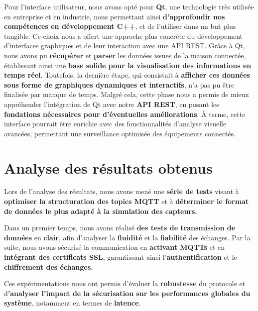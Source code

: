 \documentclass[10pt, a4paper]{report}
\begin{document}
	Pour l’interface utilisateur, nous avons opté pour \textbf{Qt}, une technologie très utilisée en entreprise et en industrie, nous permettant ainsi \textbf{d’approfondir nos compétences en développement C++}, et de l'utiliser dans un but plus tangible. Ce choix nous a offert une approche plus concrète du développement d’interfaces graphiques et de leur interaction avec une API REST.	
	Grâce à Qt, nous avons pu \textbf{récupérer} et \textbf{parser} les données issues de la maison connectée, établissant ainsi une \textbf{base solide pour la visualisation des informations en temps réel}. Toutefois, la dernière étape, qui consistait à \textbf{afficher ces données sous forme de graphiques dynamiques et interactifs}, n’a pas pu être finalisée par manque de temps.
	Malgré cela, cette phase nous a permis de mieux appréhender l’intégration de Qt avec notre \textbf{API REST}, en posant les \textbf{fondations nécessaires pour d’éventuelles améliorations}. À terme, cette interface pourrait être enrichie avec des fonctionnalités d’analyse visuelle avancées, permettant une surveillance optimisée des équipements connectés.
	
	\section{Analyse des résultats obtenus}
	
	Lors de l’analyse des résultats, nous avons mené une\textbf{ série de tests} visant à \textbf{optimiser la structuration des topics MQTT} et à \textbf{déterminer le format de données le plus adapté à la simulation des capteurs.}
	
	Dans un premier temps, nous avons réalisé \textbf{des tests de transmission de données} en \textbf{clair}, afin d’analyser la \textbf{fluidité} et la \textbf{fiabilité} des échanges. Par la suite, nous avons sécurisé la communication en \textbf{activant MQTTs} et en \textbf{intégrant des certificats SSL}, garantissant ainsi l’\textbf{authentification} et le \textbf{chiffrement des échanges}.
	
	Ces expérimentations nous ont permis d’évaluer la \textbf{robustesse} du protocole et d\textbf{’analyser l'impact de la sécurisation sur les performances globales du système}, notamment en termes de \textbf{latence}.
	
\end{document}
